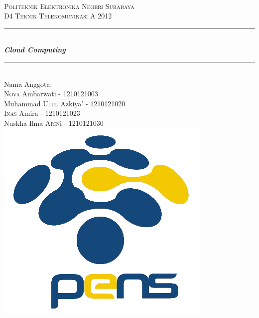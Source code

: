 \begin{titlepage}
\newcommand{\HRule}{\rule{\linewidth}{0.5mm}}
\center
\textsc{\LARGE }\\[4cm]
\textsc{\LARGE Politeknik Elektronika Negeri Surabaya}\\[1cm]
\textsc{\large D4 Teknik Telekomunikasi A 2012}\\[0.5cm]
\HRule \\[0.4cm]
{ \huge \bfseries \emph{Cloud Computing}}\\[0.4cm]
\HRule \\[1cm]
\Large Nama Anggota:\\
\textsc{Nova} Ambarwati - 1210121003\\
Muhammad \textsc{Ulul} Azkiya' - 1210121020\\
\textsc{Inas} Amira - 1210121023\\
Nuskha Ilma \textsc{Arin}i - 1210121030\\
[2cm]
\includegraphics[scale=0.4]{pens.png}\\[1cm]
\vfill
\end{titlepage}